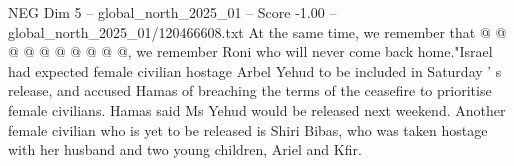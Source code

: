 \begin{textsample}{NEG Dim 5 – global\_north\_2025\_01 – Score -1.00 – global\_north\_2025\_01/120466608.txt}
At the same time, we remember that @ @ @ @ @ @ @ @ @ @, we remember Roni who will never come back home."Israel had expected female civilian hostage Arbel Yehud to be included in Saturday ' s release, and accused Hamas of breaching the terms of the ceasefire to prioritise female civilians.
Hamas said Ms Yehud would be released next weekend.
Another female civilian who is yet to be released is Shiri Bibas, who was taken hostage with her husband and two young children, Ariel and Kfir.

\end{textsample}
